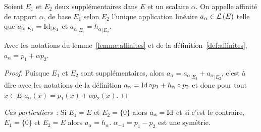 %
\begin{defdef}\label{def:affinites}
  Soient \(E_1\) et \(E_2\) deux supplémentaires dans \(E\) et un scalaire
  \(\alpha\). On appelle affinité de rapport \(\alpha\), de base \(E_1\) selon
  \(E_2\) l'unique application linéaire \(a_\alpha \in \mathcal{L}\left(E\right)\) telle que
  \({a_\alpha}_{|E_1} = \operatorname{Id}_{|E_1}\) et \({a_\alpha}_{|E_2} =
  {h_\alpha}_{|E_2}\).
\end{defdef}
%
\begin{prop}
  Avec les notations du lemme~\ref{lemme:affinites} et de la définition~\ref{def:affinites}, \(a_{\alpha}=p_1+\alpha p_2\).
\end{prop}
\begin{proof}
  Puisque \(E_1\) et \(E_2\) sont supplémentaires, alors \(a_\alpha=
  {a_\alpha}_{|E_1} + {a_\alpha}_{|E_2}\), c'est à dire avec les notations de la
  définition \(a_\alpha= \operatorname{Id} \circ p_1 + h_\alpha \circ p_2\) et donc pour tout
  \(x \in E\) \(a_\alpha(x)=p_1(x)+\alpha p_2(x)\).
\end{proof}

\emph{Cas particuliers}~: Si \(E_1=E\) et \(E_2=\{0\}\) alors \(a_\alpha=\operatorname{Id}\)
et si c'est le contraire, \(E_1=\{0\}\) et \(E_2=E\) alors
\(a_\alpha=h_\alpha\). \(\alpha_{-1}=p_1-p_2\) est une symétrie.

